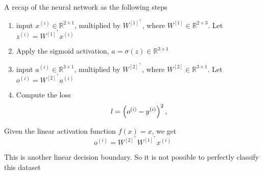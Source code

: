 \begin{answer}

A recap of the neural network as the following steps
    \begin{enumerate}
        \item input $x^{(i)} \in \mathbb{R}^{2 \times 1}$, multiplied by $W^{[1]}^\top$, where $W^{[1]} \in \mathbb{R}^{2 \times 3}$. Let $z^{(i)} = W^{[1]}^\top x^{(i)}$
        \item Apply the sigmoid activation, $a = \sigma(z) \in \mathbb{R}^{3 \times 1}$
        \item input $a^{(i)} \in \mathbb{R}^{3 \times 1}$, multiplied by $W^{[2]}^\top$, where $W^{[2]} \in \mathbb{R}^{3 \times 1}$. Let $o^{(i)} = W^{[2]}^\top a^{(i)}$
        \item Compute the loss $$l = \left(o^{(i)} - y^{(i)}\right)^2,$$
    \end{enumerate}

Given the linear activation function $f(x) = x$, we get 
\begin{equation}
    o^{(i)} = W^{[2]}^\top W^{[1]}^\top x^{(i)}
\end{equation}

This is another linear decision boundary. So it is not possible to perfectly classify this dataset

\end{answer}
